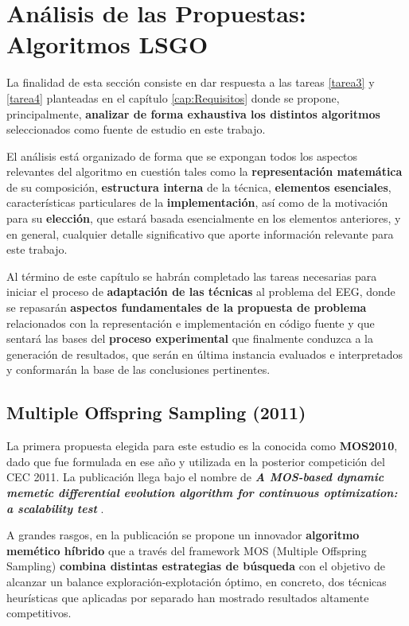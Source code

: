 \chapter{Análisis de las Propuestas: Algoritmos LSGO}\label{cap:Analisis}

La finalidad de esta sección consiste en dar respuesta a las tareas \ref{tarea3} y \ref{tarea4} planteadas en el capítulo \ref{cap:Requisitos} donde se propone, principalmente, \textbf{analizar de forma exhaustiva los distintos algoritmos} seleccionados como fuente de estudio en este trabajo. 

El análisis está organizado de forma que se expongan todos los aspectos relevantes del algoritmo en cuestión tales como la \textbf{representación matemática} de su composición, \textbf{estructura interna} de la técnica, \textbf{elementos esenciales}, características particulares de la \textbf{implementación}, así como de la motivación para su \textbf{elección}, que estará basada esencialmente en los elementos anteriores, y en general, cualquier detalle significativo que aporte información relevante para este trabajo.

Al término de este capítulo se habrán completado las tareas necesarias para iniciar el proceso de \textbf{adaptación de las técnicas} al problema del EEG, donde se repasarán \textbf{aspectos fundamentales de la propuesta de problema} relacionados con la representación e implementación en código fuente y que sentará las bases del  \textbf{proceso experimental} que finalmente conduzca a la generación de resultados, que serán en última instancia evaluados e interpretados y conformarán la base de las conclusiones pertinentes.

\section{Multiple Offspring Sampling (2011)}

La primera propuesta elegida para este estudio es la conocida como \textbf{MOS2010}, dado que fue formulada en ese año y utilizada en la posterior competición del CEC 2011\cite{ComprehensiveComparison}. La publicación llega bajo el nombre de \textbf{\textit{A MOS-based dynamic memetic differential evolution algorithm for continuous optimization: a scalability test}} \cite{MOS2010}.

A grandes rasgos, en la publicación se propone un innovador \textbf{algoritmo memético híbrido} que a través del framework MOS (Multiple Offspring Sampling)\cite{MOS-Framework} \textbf{combina distintas estrategias de búsqueda} con el objetivo de alcanzar un balance exploración-explotación óptimo, en concreto, dos técnicas heurísticas que aplicadas por separado han mostrado resultados altamente competitivos.

